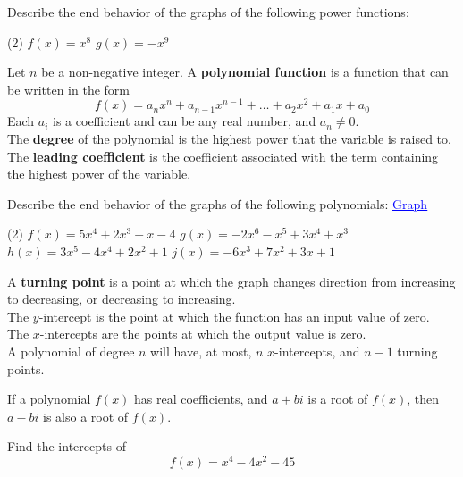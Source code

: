 \documentclass[../mathNotesPreamble]{subfiles}
\begin{document}
  \begin{ex*}
    Describe the end behavior of the graphs of the following power functions:
    \begin{extasks}[after-item-skip=\stretch{1}](2)
      \task $f(x)=x^8$
      \task $g(x)=-x^9$
    \end{extasks}
  \end{ex*}

  \begin{defn*}
    Let $n$ be a non-negative integer. A \textbf{polynomial function} is a function that can be written in the form
      \[f(x)=a_nx^n+a_{n-1}x^{n-1}+\dots+a_2x^2+a_1x+a_0\]
    Each $a_i$ is a coefficient and can be any real number, and $a_n\neq 0$.\\[\baselineskip]

    The \textbf{degree} of the polynomial is the highest power that the variable is raised to. The \textbf{leading coefficient} is the coefficient associated with the term containing the highest power of the variable.
  \end{defn*}
  \begin{ex*}
    Describe the end behavior of the graphs of the following polynomials:
    \href{https://www.desmos.com/calculator/l7sj1g3hmc}{\textcolor{blue}{\underline{Graph}}}
    \begin{extasks}[after-item-skip=\stretch{1}](2)
      \task $f(x)=5x^{4}+2x^{3}-x-4$
      \task $g(x)=-2x^{6}-x^{5}+3x^{4}+x^{3}$
      \task $h(x)=3x^{5}-4x^{4}+2x^{2}+1$
      \task $j(x)=-6x^{3}+7x^{2}+3x+1$
    \end{extasks}
  \end{ex*}
  \pagebreak

  \begin{defn*}
    A \textbf{turning point} is a point at which the graph changes direction from increasing to decreasing, or decreasing to increasing.\\

     The $y$-intercept is the point at which the function has an input value of zero.\\

     The $x$-intercepts are the points at which the output value is zero.\\

     A polynomial of degree $n$ will have, at most, $n$ $x$-intercepts, and $n-1$ turning points.
  \end{defn*}

  \begin{thmBox*}
    If a polynomial $f(x)$ has real coefficients, and $a+bi$ is a root of $f(x)$, then $a-bi$ is also a root of $f(x)$.
  \end{thmBox*}
  \begin{ex*}
    Find the intercepts of
      \[f(x)=x^4-4x^2-45\]
  \end{ex*}

  \pagebreak
\end{document}
